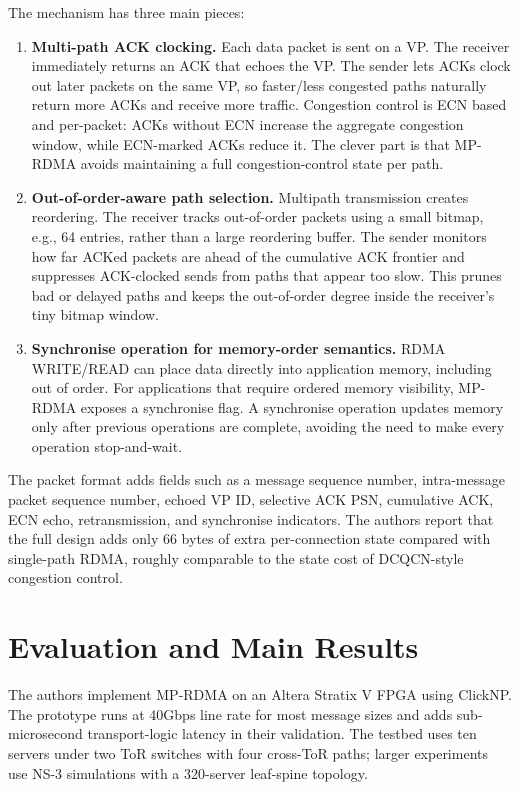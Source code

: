 \documentclass[10.5pt]{article}
\begin{document}
The mechanism has three main pieces:
\begin{enumerate}
  \item \textbf{Multi-path ACK clocking.} Each data packet is sent on a VP. The receiver immediately returns an ACK that echoes the VP. The sender lets ACKs clock out later packets on the same VP, so faster/less congested paths naturally return more ACKs and receive more traffic. Congestion control is ECN based and per-packet: ACKs without ECN increase the aggregate congestion window, while ECN-marked ACKs reduce it. The clever part is that MP-RDMA avoids maintaining a full congestion-control state per path.
  \item \textbf{Out-of-order-aware path selection.} Multipath transmission creates reordering. The receiver tracks out-of-order packets using a small bitmap, e.g., 64 entries, rather than a large reordering buffer. The sender monitors how far ACKed packets are ahead of the cumulative ACK frontier and suppresses ACK-clocked sends from paths that appear too slow. This prunes bad or delayed paths and keeps the out-of-order degree inside the receiver's tiny bitmap window.
  \item \textbf{Synchronise operation for memory-order semantics.} RDMA WRITE/READ can place data directly into application memory, including out of order. For applications that require ordered memory visibility, MP-RDMA exposes a synchronise flag. A synchronise operation updates memory only after previous operations are complete, avoiding the need to make every operation stop-and-wait.
\end{enumerate}

The packet format adds fields such as a message sequence number, intra-message packet sequence number, echoed VP ID, selective ACK PSN, cumulative ACK, ECN echo, retransmission, and synchronise indicators. The authors report that the full design adds only 66 bytes of extra per-connection state compared with single-path RDMA, roughly comparable to the state cost of DCQCN-style congestion control.

\section{Evaluation and Main Results}
The authors implement MP-RDMA on an Altera Stratix V FPGA using ClickNP. The prototype runs at 40Gbps line rate for most message sizes and adds sub-microsecond transport-logic latency in their validation. The testbed uses ten servers under two ToR switches with four cross-ToR paths; larger experiments use NS-3 simulations with a 320-server leaf-spine topology.
\end{document}
